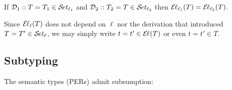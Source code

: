 \documentclass[acmsmall,screen]{acmart}\settopmatter{}
\newcommand{\LONGVERSION}[1]{}
\begin{document}
\begin{lemma}
\label{lem:indep}
  If\/ $\DD_1 :: T = T_1 \in \SET[\ell_1]$
  and $\DD_2 :: T_2 = T \in \SET[\ell_2]$ then $\EL[\ell_1](T) = \EL[\ell_2](T)$.
\end{lemma}
\LONGVERSION{
\begin{proof}
  By induction on $\DD_1$ and cases on $\DD_2$.
\end{proof}
}
Since $\EL[\ell](T)$ does not depend on $\ell$ nor the derivation that introduced $T = T' \in \SET[\ell]$,  we may simply write $t = t' \in \EL(T)$ or even $t = t' \in T$.


\subsection{Subtyping}
\label{sec:subty}

The semantic types (PERs) admit subsumption:
\end{document}
